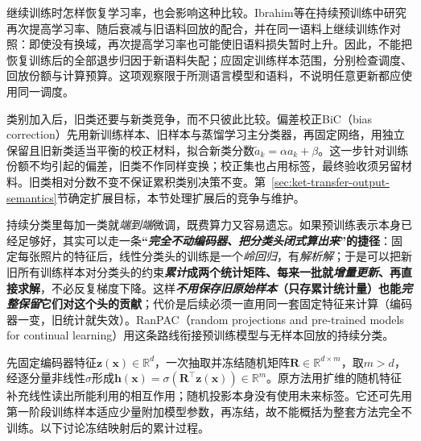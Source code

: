继续训练时怎样恢复学习率，也会影响这种比较。Ibrahim等在持续预训练中研究再次提高学习率、随后衰减与旧语料回放的配合，并在同一语料上继续训练作对照：即使没有换域，再次提高学习率也可能使旧语料损失暂时上升。因此，不能把恢复训练后的全部退步归因于新语料失配；应固定训练样本范围，分别检查调度、回放份额与计算预算。这项观察限于所测语言模型和语料，不说明任意更新都应使用同一调度。

类别加入后，旧类还要与新类竞争，而不只彼此比较。偏差校正BiC（bias correction）先用新训练样本、旧样本与蒸馏学习主分类器，再固定网络，用独立保留且旧新类适当平衡的校正材料，拟合新类分数$\tilde a_k=\alpha a_k+\beta$。这一步针对训练份额不均引起的偏差，旧类不作同样变换；校正集也占用标签，最终验收须另留材料。旧类相对分数不变不保证累积类别决策不变。第~\ref{sec:ket-transfer-output-semantics}节确定扩展目标，本节处理扩展后的竞争与维护。

持续分类里每加一类就\emph{端到端}微调，既费算力又容易遗忘。如果预训练表示本身已经足够好，其实可以走一条\textbf{“\emph{完全不动编码器、把分类头\emph{闭式}算出来}”的捷径}：固定每张照片的特征后，线性分类头的训练是一个\emph{岭回归}，有\emph{解析解}；于是可以把新旧所有训练样本对分类头的约束\textbf{\emph{累计}成两个统计矩阵、每来一批就\emph{增量更新}、再直接求解}，不必反复梯度下降。这样\textbf{\emph{不用保存旧原始样本}（只存累计统计量）也能\emph{完整保留}它们对这个头的贡献}；代价是后续必须一直用同一套固定特征来计算（编码器一变，旧统计就失效）。RanPAC（random projections and pre-trained models for continual learning）用这条路线衔接预训练模型与无样本回放的持续分类。

先固定编码器特征$\bm z(\bm x)\in\mathbb R^d$，一次抽取并冻结随机矩阵$\bm R\in\mathbb R^{d\times m}$，取$m>d$，经逐分量非线性$\sigma$形成$\bm h(\bm x)=\sigma(\bm R^\top\bm z(\bm x))\in\mathbb R^m$。原方法用扩维的随机特征补充线性读出所能利用的相互作用；随机投影本身没有使用未来标签。它还可先用第一阶段训练样本适应少量附加模型参数，再冻结，故不能概括为整套方法完全不训练。以下讨论冻结映射后的累计过程。

